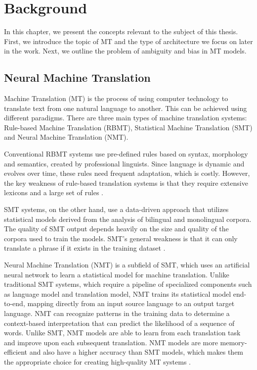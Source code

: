 \chapter{Background}
\label{ch:Background}

In this chapter, we present the concepts relevant to the subject of this thesis. First, we introduce the topic of MT and the type of architecture we focus on later in the work. Next, we outline the problem of ambiguity and bias in MT models.


\section{Neural Machine Translation}
\label{sec:Background:NMT}

Machine Translation (MT) is the process of using computer technology to translate text from one natural language to another. This can be achieved using different paradigms. There are three main types of machine translation systems: Rule-based Machine Translation (RBMT), Statistical Machine Translation (SMT) and Neural Machine Translation (NMT). 

Conventional RBMT systems use pre-defined rules based on syntax, morphology and semantics, created by professional linguists. Since language is dynamic and evolves over time, these rules need frequent adaptation, which is costly. However, the key weakness of rule-based translation systems is that they require extensive lexicons and a large set of rules \parencite{SMT_book}. 

SMT systems, on the other hand, use a data-driven approach that utilizes statistical models derived from the analysis of bilingual and monolingual corpora. The quality of SMT output depends heavily on the size and quality of the corpora used to train the models. SMT’s general weakness is that it can only translate a phrase if it exists in the training dataset \parencite{SMT_book}.

Neural Machine Translation (NMT) is a subfield of SMT, which uses an artificial neural network to learn a statistical model for machine translation. Unlike traditional SMT systems, which require a pipeline of specialized components such as language model and translation model, NMT trains its statistical model end-to-end, mapping directly from an input source language to an output target language. NMT can recognize patterns in the training data to determine a context-based interpretation that can predict the likelihood of a sequence of words. Unlike SMT, NMT models are able to learn from each translation task and improve upon each subsequent translation. NMT models are more memory-efficient and also have a higher accuracy than SMT models, which makes them the appropriate choice for creating high-quality MT systems \parencite{NMT_book}.

